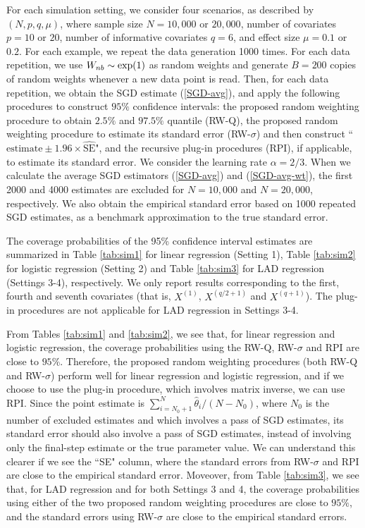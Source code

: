 \documentclass[twoside,11pt]{article}
\def\wh{\widehat}
\begin{document}
For each simulation setting, we consider four scenarios, as described by $(N, p, q, \mu)$, where sample size $N=10,000$ or $20,000$, number of covariates $p=10$ or $20$, number of informative covariates $q=6$, and effect size $\mu=0.1$ or $0.2$. For each example, we repeat the data generation 1000 times. For each data repetition, we use $W_{nb}\sim{\rm exp}(1)$ as random weights and generate $B=200$ copies of random weights whenever a new data point is read. Then, for each data repetition, we obtain the SGD estimate (\ref{SGD-avg}), and apply the following procedures to construct $95\%$ confidence intervals: the proposed random weighting procedure to obtain $2.5\%$ and $97.5\%$ quantile (RW-Q), the proposed random weighting procedure to estimate its standard error (RW-$\sigma$) and then construct ``$\mbox{estimate}\pm 1.96\times\wh{\mbox{SE}}$", and the recursive plug-in procedures (RPI), if applicable, to estimate its standard error. We consider the learning rate $\alpha=2/3$. When we calculate the average SGD estimators (\ref{SGD-avg}) and (\ref{SGD-avg-wt}), the first 2000 and 4000 estimates are excluded for $N=10,000$ and $N=20,000$, respectively. We also obtain the empirical standard error based on 1000 repeated  SGD estimates, as a benchmark approximation to the true standard error.

The coverage probabilities of the 95\% confidence interval estimates are summarized in Table \ref{tab:sim1} for linear regression (Setting 1),  Table \ref{tab:sim2} for logistic regression (Setting 2) and Table \ref{tab:sim3} for LAD regression (Settings 3-4), respectively. We only report results corresponding to the first, fourth and seventh covariates (that is, $X^{(1)}$, $X^{(q/2+1)}$ and $X^{(q+1)}$). The plug-in procedures are not applicable for LAD regression in Settings 3-4.

From Tables \ref{tab:sim1} and \ref{tab:sim2}, we see that, for linear regression and logistic regression, the coverage probabilities using the RW-Q, RW-$\sigma$ and RPI are close to $95\%$. Therefore, the proposed random weighting procedures (both RW-Q and RW-$\sigma$) perform well for linear regression and logistic regression, and if we choose to use the plug-in procedure, which involves matrix inverse, we can use RPI. Since the point estimate is $\sum_{i=N_0+1}^N \wh{\theta}_i/(N-N_0)$, where $N_0$ is the number of excluded estimates and which involves a pass of SGD estimates, its standard error should also involve a pass of SGD estimates, instead of involving only the final-step estimate or the true parameter value. We can understand this clearer if we see the ``SE" column, where the standard errors from RW-$\sigma$ and RPI are close to the empirical standard error. Moveover, from Table  \ref{tab:sim3}, we see that, for LAD regression and for both Settings 3 and 4, the coverage probabilities using either of the two proposed random weighting procedures are close to $95\%$, and the standard errors using RW-$\sigma$ are close to the empirical standard errors.
\end{document}
